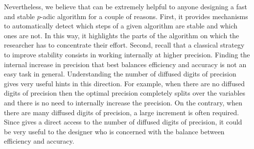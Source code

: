 \documentclass[sigconf]{acmart}
\newcommand{\ZpL}{\text{\color{output} \rm \tt ZpL}\xspace}
\theoremstyle{definition}
\begin{document}
Nevertheless, we believe that \ZpL can be extremely helpful to 
anyone designing a fast and stable $p$-adic algorithm for a couple 
of reasons. First, it provides mechanisms 
to automatically detect which steps of a given algorithm are stable and 
which ones are not. In this way, it highlights the parts of the algorithm 
on which the researcher has to concentrate their effort.
Second, recall that a classical strategy to improve stability consists 
in working internally at higher precision. Finding the internal increase
in precision that best balances efficiency and accuracy is not an easy
task in general. Understanding the number of diffused digits of 
precision gives very useful hints in this direction. For example, when there are
no diffused digits of precision then the optimal precision completely splits over the
variables and there is no need to internally increase the precision. On 
the contrary, when there are many diffused digits of precision, a large 
increment is often required.
Since \ZpL gives a direct access to the number of diffused digits of 
precision, it could be very useful to the designer who is concerned
with the balance between efficiency and accuracy.
\end{document}
